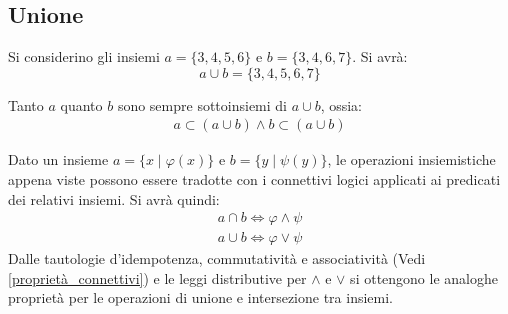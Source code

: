 \subsection{Unione}

\begin{center}
	\def\firstcircle{(0,0) circle (1.5cm)}
	\def\secondcircle{(0:2cm) circle (1.5cm)}
	\setlength{\parskip}{5mm}
\end{center}

\begin{example}
 Si considerino gli insiemi $a=\{3,4,5,6\}$ e $b=\{3,4,6,7\}$. Si avrà:
	\begin{displaymath}
		a \cup b = \{3,4,5,6,7\}
	\end{displaymath}
\end{example}
\begin{osservation}
Tanto $a$ quanto $b$ sono sempre sottoinsiemi di $a \cup b$, ossia:
	\begin{align*}
		a \subset (a \cup b) \land b \subset (a \cup b)
	\end{align*}
\end{osservation}

Dato un insieme $a=\{x \; | \; \varphi(x)\}$ e $b=\{y \; | \; \psi(y)\}$, le operazioni insiemistiche appena viste possono essere tradotte con i connettivi logici applicati ai predicati dei relativi insiemi. Si avrà quindi:
\begin{eqnarray*}
	a \cap b \iff \varphi \land \psi \\
	a \cup b \iff \varphi \lor \psi
\end{eqnarray*}
Dalle tautologie d'idempotenza, commutatività e associatività (Vedi \ref{proprietà_connettivi}) e le leggi distributive per $\land$ e $\lor$ si ottengono le analoghe proprietà per le operazioni di unione e intersezione tra insiemi.

